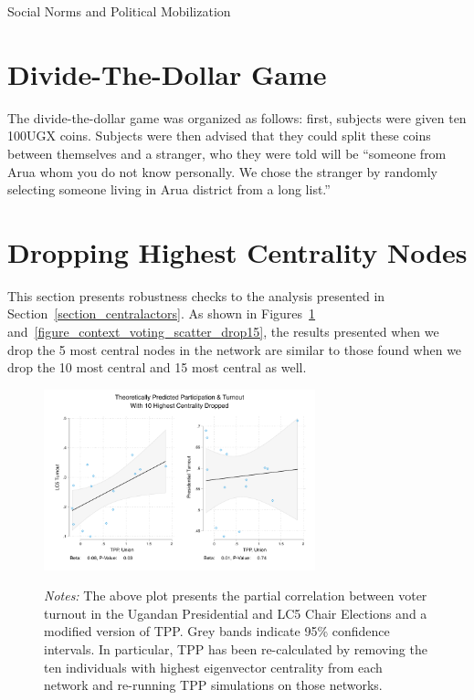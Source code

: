 \documentclass[12pt]{article}
\begin{document}
\begin{appendix}
\begin{table}

  \caption{Social Norms and Political Mobilization}\label{table_heterogeneous_by_blockvoting}
  
\end{table}


\pagebreak
\section{Divide-The-Dollar Game}\label{appendix_divide_the_dollar}
The divide-the-dollar game was organized as follows: first, subjects were given ten 100UGX coins. Subjects were then advised that they could split these coins between themselves and a stranger, who they were told will be ``someone from Arua whom you do not know personally. We chose the stranger by randomly selecting someone living in Arua district from a long list.''

\pagebreak
\section{Dropping Highest Centrality Nodes}\label{appendix_dropping_highest}

This section presents robustness checks to the analysis presented in Section~\ref{section_centralactors}. As shown in Figures~\ref{figure_context_voting_scatter_drop10} and~\ref{figure_context_voting_scatter_drop15}, the results presented when we drop the 5 most central nodes in the network are similar to those found when we drop the 10 most central and 15 most central as well.

\begin{figure}[hb!]
  \begin{center}
    \caption{}\label{figure_context_voting_scatter_drop10}
      \includegraphics[width=0.7\textwidth]{../3_results/context_voting_scatter_drop10.pdf}
  \end{center}
	\scriptsize{\emph{Notes:}  The above plot presents the partial correlation between voter turnout in the Ugandan Presidential and LC5 Chair Elections and a modified version of TPP.  Grey bands indicate 95\% confidence intervals. In particular, TPP has been re-calculated by removing the ten individuals with highest eigenvector centrality from each network and re-running TPP simulations on those networks.}
\end{figure}


\end{appendix}
\end{document}
